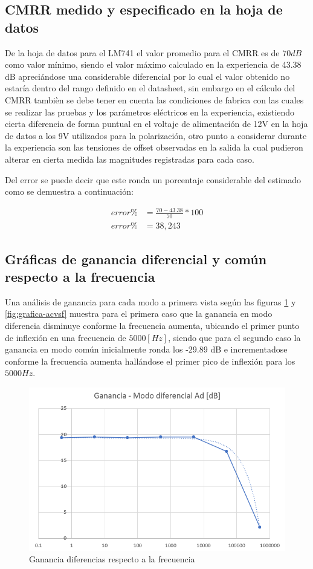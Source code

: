 \subsection{CMRR medido y especificado en la hoja de datos}

De la hoja de datos para el LM741 el valor promedio para el CMRR es de $70 dB$ como valor mínimo, siendo el valor máximo calculado en la experiencia de 43.38 dB apreciándose una considerable diferencial por lo cual el valor obtenido no estaría dentro del rango definido en el datasheet, sin embargo en el cálculo del CMRR tambièn se debe tener en cuenta las condiciones de fabrica con las cuales se realizar las pruebas y los parámetros eléctricos en la experiencia, existiendo cierta diferencia de forma puntual en el voltaje de alimentación de 12V en la hoja de datos a los 9V utilizados para la polarización, otro punto a considerar durante la experiencia son las tensiones de offset observadas en la salida la cual pudieron alterar en cierta medida las magnitudes registradas para cada caso.

Del error se puede decir que este ronda un porcentaje considerable del estimado como se demuestra a continuación:

\begin{align}
	error \% &= \frac{70 - 43.38}{70}*100 \\
	error \% &= 38,243
\end{align}

\subsection{Gráficas de ganancia diferencial y común respecto a la frecuencia}

Una análisis de ganancia para cada modo a primera vista según las figuras \ref{fig:grafica-advsf} y \ref{fig:grafica-acvsf} muestra para el primera caso que la ganancia en modo diferencia disminuye conforme la frecuencia aumenta, ubicando el primer punto de inflexión en una frecuencia de $5000 [Hz]$, siendo que para el segundo caso la ganancia en modo común inicialmente ronda los -29.89 dB e incrementadose conforme la frecuencia aumenta hallándose el primer pico de inflexión para los $5000 Hz$.

\begin{figure}[h]
	\centering
	\includegraphics[width=0.5\linewidth]{media/grafica-advsf}
	\caption{Ganancia diferencias respecto a la frecuencia}
	\label{fig:grafica-advsf}
\end{figure}

